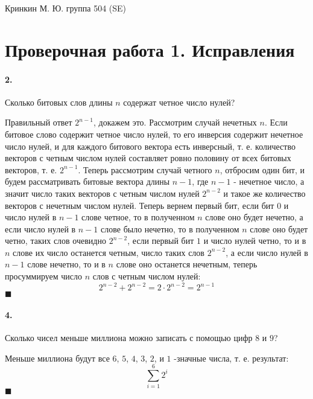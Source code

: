 \documentclass[a4paper,12pt]{article}
\begin{document}
\sloppy

\lstset{
	basicstyle=\small,
	stringstyle=\ttfamily,
	showstringspaces=false,
	columns=fixed,
	breaklines=true,
	numbers=right,
	numberstyle=\tiny
}

\newtheorem{Def}{Определение}[section]
\newtheorem{Th}{Теорема}
\newtheorem{Lem}[Th]{Лемма}
\newenvironment{Proof}
	{\par\noindent{\bf Доказательство.}}
	{\hfill$\scriptstyle\blacksquare$}
\newenvironment{Solution}
	{\par\noindent{\bf Решение.}}
	{\hfill$\scriptstyle\blacksquare$}


\begin{flushright}
	Кринкин М. Ю. группа 504 (SE)
\end{flushright}

\section{Проверочная работа 1. Исправления}

\paragraph{2.} Сколько битовых слов длины $n$ содержат четное число нулей?
\begin{Solution}
Правильный ответ $2^{n-1}$, докажем это. Рассмотрим случай нечетных $n$. Если битовое слово содержит четное число нулей, то его инверсия содержит нечетное число нулей, и для каждого битового вектора есть инверсный, т. е. количество векторов с четным числом нулей составляет ровно половину от всех битовых векторов, т. е. $2^{n-1}$. Теперь рассмотрим случай четного $n$, отбросим один бит, и будем рассматривать битовые вектора длины $n-1$, где $n-1$ - нечетное число, а значит число таких векторов с четным числом нулей $2^{n-2}$ и такое же количество векторов с нечетным числом нулей. Теперь вернем первый бит, если бит $0$ и число нулей в $n-1$ слове четное, то в полученном $n$ слове оно будет нечетно, а если число нулей в $n-1$ слове было нечетно, то в полученном $n$ слове оно будет четно, таких слов очевидно $2^{n-2}$, если первый бит $1$ и число нулей четно, то и в $n$ слове их число останется четным, число таких слов $2^{n-2}$, а если число нулей в $n-1$ слове нечетно, то и в $n$ слове оно останется нечетным, теперь просуммируем число $n$ слов с четным числом нулей:
\[
	2^{n-2} + 2^{n-2} = 2 \cdot 2^{n-2} = 2^{n-1}
\]
\end{Solution}

\paragraph{4.} Сколько чисел меньше миллиона можно записать с помощью цифр $8$ и $9$?
\begin{Solution}
Меньше миллиона будут все $6$, $5$, $4$, $3$, $2$, и $1$ -значные числа, т. е. результат:
\[
	\sum_{i=1}^6 2^i
\]
\end{Solution}
\end{document}
